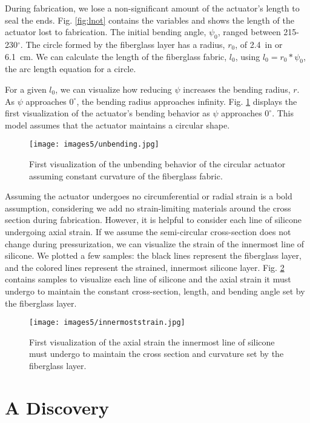 During fabrication, we lose a non-significant amount of the actuator's length to seal the ends. Fig. \ref{fig:lnot} contains the variables and shows the length of the actuator lost to fabrication. The initial bending angle, $\psi_{0}$, ranged between 215-230$^\circ$. The circle formed by the fiberglass layer has a radius, $r_{0}$, of 2.4~in or 6.1~cm. We can calculate the length of the fiberglass fabric, $l_{0}$, using $l_{0} = r_{0}*\psi_{0}$, the arc length equation for a circle. 

For a given $l_{0}$, we can visualize how reducing $\psi$ increases the bending radius, $r$. As $\psi$ approaches $0^\circ$, the bending radius approaches infinity. Fig. \ref{fig:unbending} displays the first visualization of the actuator's bending behavior as $\psi$ approaches $0^\circ$. This model assumes that the actuator maintains a circular shape. 
\\
\begin{figure}[ht]
    \centering
    \texttt{[image: images5/unbending.jpg]}
    \caption{First visualization of the unbending behavior of the circular actuator assuming constant curvature of the fiberglass fabric.}
    \label{fig:unbending}
\end{figure}

Assuming the actuator undergoes no circumferential or radial strain is a bold assumption, considering we add no strain-limiting materials around the cross section during fabrication. However, it is helpful to consider each line of silicone undergoing axial strain. If we assume the semi-circular cross-section does not change during pressurization, we can visualize the strain of the innermost line of silicone. We plotted a few samples: the black lines represent the fiberglass layer, and the colored lines represent the strained, innermost silicone layer. Fig. \ref{fig:innermoststrain} contains samples to visualize each line of silicone and the axial strain it must undergo to maintain the constant cross-section, length, and bending angle set by the fiberglass layer. 

\begin{figure}[ht]
    \centering
    \texttt{[image: images5/innermoststrain.jpg]}
    \caption{First visualization of the axial strain the innermost line of silicone must undergo to maintain the cross section and curvature set by the fiberglass layer.}
    \label{fig:innermoststrain}
\end{figure}

\section{A Discovery}

